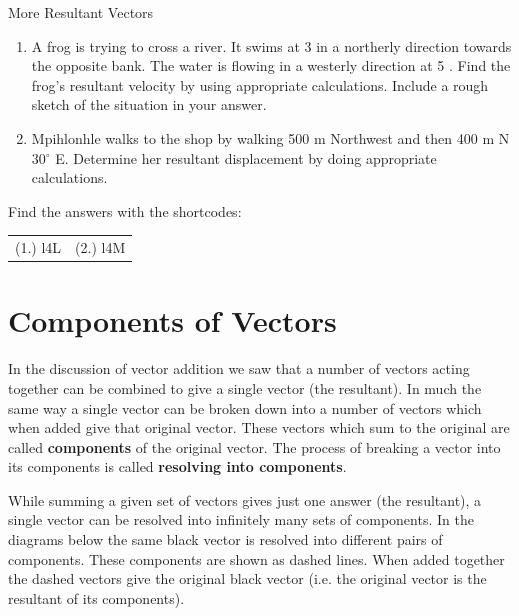 \begin{exercises}{More Resultant Vectors} \noindent
\begin{enumerate}[noitemsep, label=\textbf{\arabic*}.] 
\item A frog is trying to cross a river. It swims at 3 \ms in a northerly direction towards the opposite bank. The water is flowing in a westerly direction at 5 \ms. Find the frog's resultant velocity by using appropriate calculations. Include a rough sketch of the situation in your answer.
\item Mpihlonhle walks to the shop by walking 500 m Northwest and then 400 m N 30$^\circ$ E. Determine her resultant displacement by doing appropriate calculations.
\end{enumerate}

  \label{59e414b70efc194a27a122db47d06ce6**end}
\par {} Find the answers with the shortcodes:
 \par \begin{tabular}[h]{cc}
 (1.) l4L  &  (2.) l4M   & \end{tabular}
\end{exercises}
\section{Components of Vectors}
In the discussion of vector addition we saw that a number of vectors acting
together can be combined to give a single vector (the resultant). In
much the same way a single vector can be broken down into a number of vectors which when added give that original vector. These vectors which sum to the original are called {\bf components} of the original vector. The process of breaking a vector into its components is called {\bf resolving into components}.

While summing a given set of vectors gives just one answer (the
resultant), a single vector can be resolved into infinitely many sets
of components. In the diagrams below the same black vector is resolved
into different pairs of components. These components are shown as dashed lines. When added together the dashed vectors give the original black vector
(i.e. the original vector is the resultant of its components).

